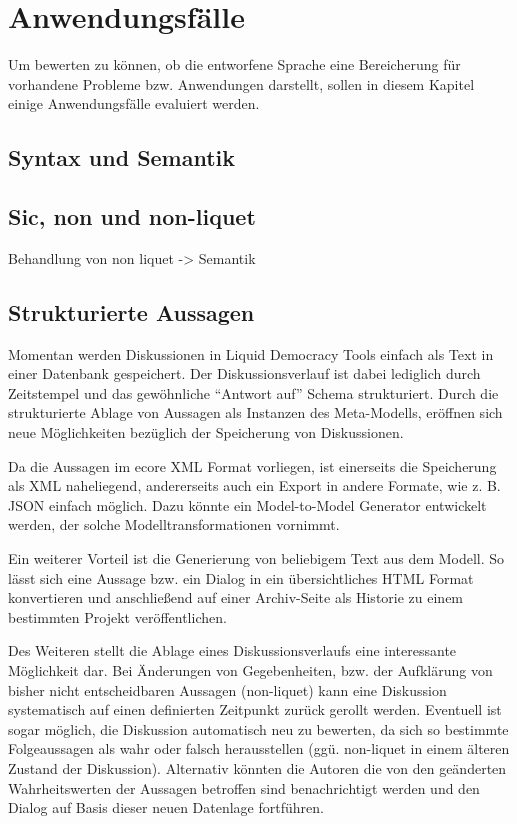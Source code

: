 \documentclass[11pt,a4paper,bibtotocnumbered]{scrreprt}
\begin{document}
\chapter{Anwendungsfälle} %

Um bewerten zu können, ob die entworfene Sprache eine Bereicherung für vorhandene Probleme bzw. Anwendungen darstellt, sollen in diesem Kapitel einige Anwendungsfälle evaluiert werden.

\section{Syntax und Semantik} %

\section{Sic, non und non-liquet} %
Behandlung von non liquet -> Semantik

\section{Strukturierte Aussagen} %

Momentan werden Diskussionen in Liquid Democracy Tools einfach als Text in einer Datenbank gespeichert.
Der Diskussionsverlauf ist dabei lediglich durch Zeitstempel und das gewöhnliche \enquote{Antwort auf} Schema strukturiert.
Durch die strukturierte Ablage von Aussagen als Instanzen des Meta-Modells, eröffnen sich neue Möglichkeiten bezüglich der Speicherung von Diskussionen.

Da die Aussagen im ecore XML Format vorliegen, ist einerseits die Speicherung als XML naheliegend, andererseits auch ein Export in andere Formate, wie z. B. JSON einfach möglich.
Dazu könnte ein Model-to-Model Generator entwickelt werden, der solche Modelltransformationen vornimmt.

Ein weiterer Vorteil ist die Generierung von beliebigem Text aus dem Modell.
So lässt sich eine Aussage bzw. ein Dialog in ein übersichtliches HTML Format konvertieren und anschließend auf einer Archiv-Seite als Historie zu einem bestimmten Projekt veröffentlichen.

Des Weiteren stellt die Ablage eines Diskussionsverlaufs eine interessante Möglichkeit dar.
Bei Änderungen von Gegebenheiten, bzw. der Aufklärung von bisher nicht entscheidbaren Aussagen (non-liquet) kann eine Diskussion systematisch auf einen definierten Zeitpunkt zurück gerollt werden.
Eventuell ist sogar möglich, die Diskussion automatisch neu zu bewerten, da sich so bestimmte Folgeaussagen als wahr oder falsch herausstellen (ggü. non-liquet in einem älteren Zustand der Diskussion).
Alternativ könnten die Autoren die von den geänderten Wahrheitswerten der Aussagen betroffen sind benachrichtigt werden und den Dialog auf Basis dieser neuen Datenlage fortführen.
\end{document}
